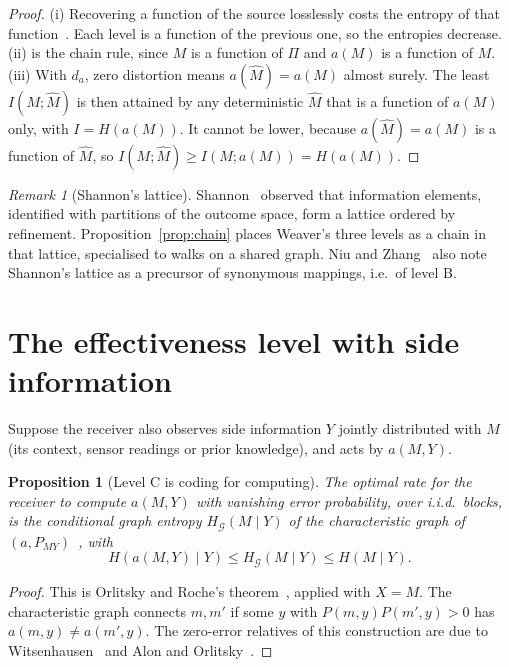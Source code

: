 \documentclass[11pt]{article}
\newtheorem{proposition}{Proposition}
\theoremstyle{definition}
\theoremstyle{remark}
\newtheorem{remark}{Remark}
\begin{document}
\begin{proof}
(i) Recovering a function of the source losslessly costs the entropy of that function~\cite{cover2006}. Each level is a function of the previous one, so the entropies decrease. (ii) is the chain rule, since $M$ is a function of $\Pi$ and $a(M)$ is a function of $M$. (iii) With $d_a$, zero distortion means $a(\hat M)=a(M)$ almost surely. The least $I(M;\hat M)$ is then attained by any deterministic $\hat M$ that is a function of $a(M)$ only, with $I=H(a(M))$. It cannot be lower, because $a(\hat M)=a(M)$ is a function of $\hat M$, so $I(M;\hat M)\ge I(M;a(M))=H(a(M))$.
\end{proof}

\begin{remark}[Shannon's lattice]
Shannon~\cite{shannon1953} observed that information elements, identified with partitions of the outcome space, form a lattice ordered by refinement. Proposition~\ref{prop:chain} places Weaver's three levels as a chain in that lattice, specialised to walks on a shared graph. Niu and Zhang~\cite[\S2.3]{niu2025} also note Shannon's lattice as a precursor of synonymous mappings, i.e.\ of level B.
\end{remark}

\section{The effectiveness level with side information}

Suppose the receiver also observes side information $Y$ jointly distributed with $M$ (its context, sensor readings or prior knowledge), and acts by $a(M,Y)$.

\begin{proposition}[Level C is coding for computing]\label{prop:computing}
The optimal rate for the receiver to compute $a(M,Y)$ with vanishing error probability, over i.i.d.\ blocks, is the conditional graph entropy $H_{\mathcal{G}}(M\mid Y)$ of the characteristic graph of $(a,P_{MY})$~\cite{orlitsky2001}, with
\[
H(a(M,Y)\mid Y)\le H_{\mathcal{G}}(M\mid Y)\le H(M\mid Y).
\]
\end{proposition}

\begin{proof}
This is Orlitsky and Roche's theorem~\cite{orlitsky2001}, applied with $X=M$. The characteristic graph connects $m,m'$ if some $y$ with $P(m,y)P(m',y)>0$ has $a(m,y)\neq a(m',y)$. The zero-error relatives of this construction are due to Witsenhausen~\cite{witsenhausen1976} and Alon and Orlitsky~\cite{alon1996}.
\end{proof}
\end{document}
